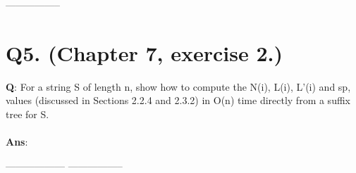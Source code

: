 \documentclass[a4paper,11pt]{article}
\begin{document}
\begin{center}
-----------------\\
\end{center}

\section*{Q5. (Chapter 7, exercise 2.)}
\textbf{Q}: For a string S of length n, show how to compute the N(i), L(i), L'(i) and sp, values (discussed in Sections 2.2.4 and 2.3.2) in O(n) time directly from a suffix tree for S.
\\
\\
\textbf{Ans}:

\begin{center}

 ------------------ -----------------
\end{center}
\end{document}
